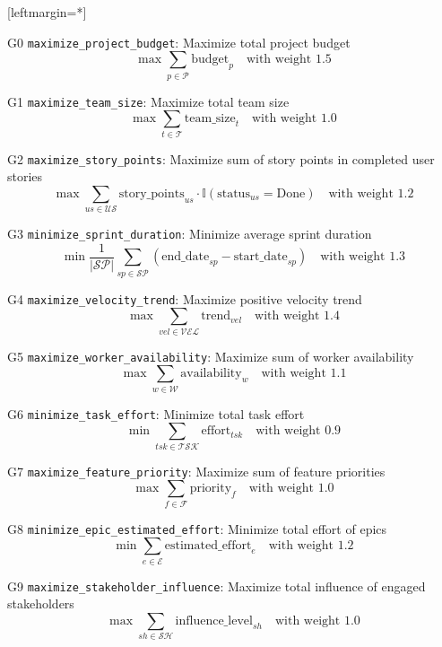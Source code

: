 \documentclass[12pt]{article}
\begin{document}
[leftmargin=*]
    \item[G0] \texttt{maximize\_project\_budget}: Maximize total project budget
    \[
    \max \sum_{p \in \mathcal{P}} \text{budget}_p \quad \text{with weight } 1.5
    \]

    \item[G1] \texttt{maximize\_team\_size}: Maximize total team size
    \[
    \max \sum_{t \in \mathcal{T}} \text{team\_size}_t \quad \text{with weight } 1.0
    \]

    \item[G2] \texttt{maximize\_story\_points}: Maximize sum of story points in completed user stories
    \[
    \max \sum_{us \in \mathcal{US}} \text{story\_points}_{us} \cdot \mathbb{I}(\text{status}_{us} = \text{Done}) \quad \text{with weight } 1.2
    \]

    \item[G3] \texttt{minimize\_sprint\_duration}: Minimize average sprint duration
    \[
    \min \frac{1}{|\mathcal{SP}|} \sum_{sp \in \mathcal{SP}} (\text{end\_date}_{sp} - \text{start\_date}_{sp}) \quad \text{with weight } 1.3
    \]

    \item[G4] \texttt{maximize\_velocity\_trend}: Maximize positive velocity trend
    \[
    \max \sum_{vel \in \mathcal{VEL}} \text{trend}_{vel} \quad \text{with weight } 1.4
    \]

    \item[G5] \texttt{maximize\_worker\_availability}: Maximize sum of worker availability
    \[
    \max \sum_{w \in \mathcal{W}} \text{availability}_w \quad \text{with weight } 1.1
    \]

    \item[G6] \texttt{minimize\_task\_effort}: Minimize total task effort
    \[
    \min \sum_{tsk \in \mathcal{TSK}} \text{effort}_{tsk} \quad \text{with weight } 0.9
    \]

    \item[G7] \texttt{maximize\_feature\_priority}: Maximize sum of feature priorities
    \[
    \max \sum_{f \in \mathcal{F}} \text{priority}_f \quad \text{with weight } 1.0
    \]

    \item[G8] \texttt{minimize\_epic\_estimated\_effort}: Minimize total effort of epics
    \[
    \min \sum_{e \in \mathcal{E}} \text{estimated\_effort}_e \quad \text{with weight } 1.2
    \]

    \item[G9] \texttt{maximize\_stakeholder\_influence}: Maximize total influence of engaged stakeholders
    \[
    \max \sum_{sh \in \mathcal{SH}} \text{influence\_level}_{sh} \quad \text{with weight } 1.0
    \]
\end{document}
